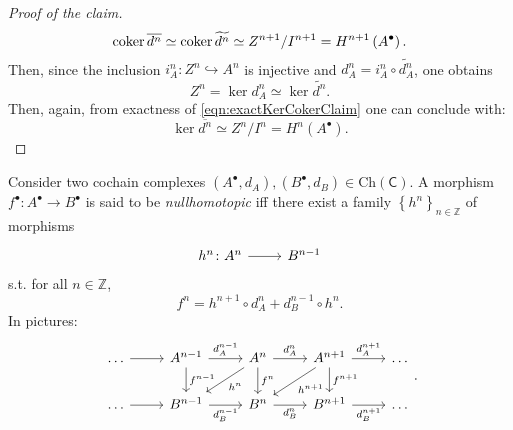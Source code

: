 \documentclass[../Main]{subfiles}
\begin{document}
\begin{proof}[Proof of the claim]
	\begin{equation}
		\operatorname{coker} \overline{d^n} \simeq \operatorname{coker} \widetilde{d^n} \simeq
		Z^{n+1}/I^{n+1} = H^{n+1} \left( A^\bullet \right)
	.\end{equation} 
	Then, since the inclusion $i^n_A\colon Z^n \hookrightarrow A^n$ is injective
	and $d^n_A = i^n_A \circ \widetilde{d^n_A}$,
	one obtains 
	\begin{equation}
	Z^n = \ker d^n_A \simeq \ker \widetilde{d^n}
	.\end{equation} 
	Then, again, from exactness of \eqref{eqn:exactKerCokerClaim}
	one can conclude with:
	\begin{equation}
		\ker \overline{d^n} \simeq Z^n/I^n = H^{n} \left( A^\bullet \right)
	.\end{equation} 
\end{proof}

\begin{defn}
	Consider two cochain complexes $\left( A^{\bullet}, d_{A} \right),
	\left( B^{\bullet}, d_{B} \right) \in \mathrm{Ch}(\mathsf{C})$.
	A morphism $f^\bullet\colon A^\bullet \to B^\bullet$ is said
	to be {\em nullhomotopic} iff there exist a family 
	$\left\{ h^n \right\}_{n \in \mathbb{Z}}$ of morphisms
	\begin{equation}
	\begin{tikzcd}
		h^n \colon A^n \arrow[r, "", rightarrow] &
		B^{n-1}
	\end{tikzcd}
	\end{equation} 
	s.t. for all $n \in \mathbb{Z}$,
	\begin{equation}
	f^n = h^{n+1} \circ d_A^n + d_B^{n-1} \circ h^n
	.\end{equation} 
	In pictures:
	\begin{equation}
	\begin{tikzcd}
		\ldots \arrow[r, "", rightarrow] &
		A^{n-1} \arrow[r, "d^{n-1}_A", rightarrow] \arrow[d, "f^{n-1}", rightarrow] &
		A^n \arrow[r, "d_A^n", rightarrow] \arrow[d, "f^n", rightarrow] 
						 \arrow[ld, "h^n", rightarrow] &
		A^{n+1} \arrow[r, "d_A^{n+1}", rightarrow] \arrow[d, "f^{n+1}", rightarrow]
						\arrow[ld, "h^{n+1}", rightarrow] &
		\ldots\\
		\ldots \arrow[r, "", rightarrow] &
		B^{n-1} \arrow[r, "d_B^{n-1}"', rightarrow] &
		B^n \arrow[r, "d_B^n"', rightarrow] &
		B^{n+1} \arrow[r, "d_B^{n+1}"', rightarrow] &
		\ldots
	\end{tikzcd}
	.\end{equation} 
\end{defn}
\end{document}
